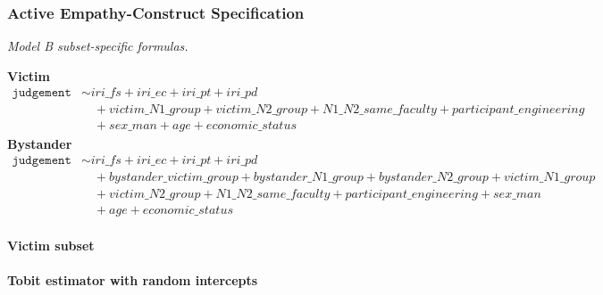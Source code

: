 \documentclass[11pt]{article}
\begin{document}
\subsubsection{Active Empathy-Construct Specification}
\textit{Model B subset-specific formulas.}
\begin{flushleft}
\textbf{Victim}
\[
\begin{aligned}
\texttt{judgement} &\sim iri\_fs + iri\_ec + iri\_pt + iri\_pd \\
&\quad + victim\_N1\_group + victim\_N2\_group + N1\_N2\_same\_faculty + participant\_engineering \\
&\quad + sex\_man + age + economic\_status
\end{aligned}
\]
\textbf{Bystander}
\[
\begin{aligned}
\texttt{judgement} &\sim iri\_fs + iri\_ec + iri\_pt + iri\_pd \\
&\quad + bystander\_victim\_group + bystander\_N1\_group + bystander\_N2\_group + victim\_N1\_group \\
&\quad + victim\_N2\_group + N1\_N2\_same\_faculty + participant\_engineering + sex\_man \\
&\quad + age + economic\_status
\end{aligned}
\]
\end{flushleft}

\paragraph{Victim subset}

\paragraph{Tobit estimator with random intercepts}
\end{document}
